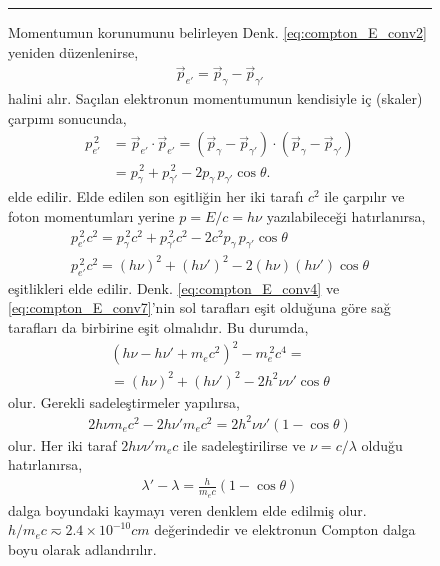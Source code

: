 \documentclass[a4paper,12pt, twoside]{article}
\begin{document}
\begin{figure}[hbtp]
\begin{minipage}{0.54\textwidth}
\noindent\rule{.98\textwidth}{0.4pt}
Momentumun korunumunu belirleyen Denk. \ref{eq:compton_E_conv2} yeniden düzenlenirse,
\begin{align}
\label{eq:compton_E_conv5}
\vec{p}_{e'} = \vec{p}_\gamma - \vec{p}_{\gamma'}
\end{align}
halini alır. Saçılan elektronun momentumunun kendisiyle iç (skaler) çarpımı sonucunda,
\begin{align}
\label{eq:compton_E_conv6}
p_{e'}^{\, 2} &= \vec{p}_{e'}\cdot\vec{p}_{e'} = (\vec{p}_\gamma - \vec{p}_{\gamma'}) \cdot (\vec{p}_\gamma - \vec{p}_{\gamma'}) \\
 &= p_{\gamma}^{\, 2} + p_{\gamma'}^{\, 2} - 2 p_{\gamma}\, p_{\gamma'} \cos\theta. 
\end{align}
elde edilir. Elde edilen son eşitliğin her iki tarafı $c^2$ ile çarpılır ve foton momentumları yerine $p = E/c = h\nu$ yazılabileceği hatırlanırsa,
\begin{align}
\label{eq:compton_E_conv7}
p_{e'}^{\, 2}c^2 = p_{\gamma}^{\, 2}c^2 + p_{\gamma'}^{\, 2}c^2 - 2c^2 p_{\gamma}\, p_{\gamma'} \cos\theta \nonumber \\
p_{e'}^{\, 2}c^2 = (h \nu)^2 + (h \nu')^2 - 2(h\nu)(h \nu')\cos{\theta}
\end{align}
eşitlikleri elde edilir. Denk. \ref{eq:compton_E_conv4} ve  \ref{eq:compton_E_conv7}'nin sol tarafları eşit olduğuna göre sağ tarafları da birbirine eşit olmalıdır. Bu durumda,
\begin{align}
\label{eq:compton_E_conv8}
(h\nu - h\nu' + m_e c^2)^2 - m_e^{\, 2}c^4 = \nonumber\\
= \left(h\nu\right)^2 + \left(h \nu'\right)^2 - 2h^2 \nu\nu'\cos{\theta}
\end{align}
olur. Gerekli sadeleştirmeler yapılırsa,
\begin{align}
\label{eq:compton_E_conv9}
2 h \nu m_e c^2-2 h \nu' m_e c^2   = 2 h^2 \nu \nu' \left( 1 - \cos \theta \right)
\end{align}
olur. Her iki taraf $ 2h\nu\nu'm_e c$ ile sadeleştirilirse ve $\nu = c/\lambda$ olduğu hatırlanırsa,
\begin{align}
\label{eq:compton_E_conv10}
\lambda'-\lambda = \frac{h}{m_ec}(1-\cos{\theta})
\end{align}
dalga boyundaki kaymayı veren denklem elde edilmiş olur. $h/m_e c \eqsim 2.4\times10^{-10} cm$ değerindedir ve elektronun Compton dalga boyu olarak adlandırılır.

\end{minipage}
\end{figure}
\end{document}
